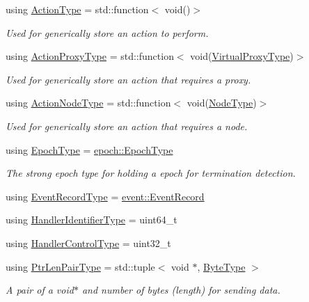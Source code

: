 \begin{DoxyCompactItemize}
using \hyperlink{namespacevt_ae0a5a7b18cc99d7b732cb4d44f46b0f3}{Action\+Type} = std\+::function$<$ void()$>$
\begin{DoxyCompactList}\small\item\em Used for generically store an action to perform. \end{DoxyCompactList}\item 
using \hyperlink{namespacevt_a102aa105d64254d89f7e585d106c95aa}{Action\+Proxy\+Type} = std\+::function$<$ void(\hyperlink{namespacevt_a1b417dd5d684f045bb58a0ede70045ac}{Virtual\+Proxy\+Type})$>$
\begin{DoxyCompactList}\small\item\em Used for generically store an action that requires a proxy. \end{DoxyCompactList}\item 
using \hyperlink{namespacevt_a0436cb2d620dcbb21b5b49cd9c9c4749}{Action\+Node\+Type} = std\+::function$<$ void(\hyperlink{namespacevt_a866da9d0efc19c0a1ce79e9e492f47e2}{Node\+Type})$>$
\begin{DoxyCompactList}\small\item\em Used for generically store an action that requires a node. \end{DoxyCompactList}\item 
using \hyperlink{namespacevt_a81d11b28122d43bf9834577e4a06440f}{Epoch\+Type} = \hyperlink{structvt_1_1epoch_1_1_epoch_type}{epoch\+::\+Epoch\+Type}
\begin{DoxyCompactList}\small\item\em The strong epoch type for holding a epoch for termination detection. \end{DoxyCompactList}\item 
using \hyperlink{namespacevt_a2dc2f149222f88a250ec9a13db36865d}{Event\+Record\+Type} = \hyperlink{structvt_1_1event_1_1_event_record}{event\+::\+Event\+Record}
\item 
using \hyperlink{namespacevt_a59ae068fe828d1c33051ff96f3d016b6}{Handler\+Identifier\+Type} = uint64\+\_\+t
\item 
using \hyperlink{namespacevt_adbbef13b92f0a93b14c219b7cc8a48f2}{Handler\+Control\+Type} = uint32\+\_\+t
\item 
using \hyperlink{namespacevt_a97f320a1d3b9b4035e591671cd7d10f0}{Ptr\+Len\+Pair\+Type} = std\+::tuple$<$ void $\ast$, \hyperlink{namespacevt_aab8d55968084610ce3b17057981e9300}{Byte\+Type} $>$
\begin{DoxyCompactList}\small\item\em A pair of a void$\ast$ and number of bytes (length) for sending data. \end{DoxyCompactList}\item 

\end{DoxyCompactItemize}
